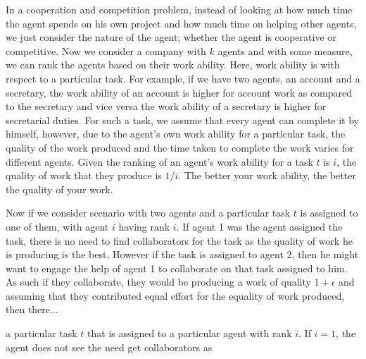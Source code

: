 \documentclass[a4paper,10pt]{article}
\theoremstyle{definition}
\begin{document}
In a cooperation and competition problem, instead of looking at how much time the agent spends on his own project and how much time on helping other agents, we just consider the nature of the agent; whether the agent is cooperative or competitive. Now we consider a company with $k$ agents and with some measure, we can rank the agents based on their work ability. Here, work ability is with respect to a particular task. For example, if we have two agents, an account and a secretary, the work ability of an account is higher for account work as compared to the secretary and vice versa the work ability of a secretary is higher for secretarial duties. For such a task, we assume that every agent can complete it by himself, however, due to the agent's own work ability for a particular task, the quality of the work produced and the time taken to complete the work varies for different agents. Given the ranking of an agent's work ability for a task $t$ is $i$, the quality of work that they produce is $1/i$. The better your work ability, the better the quality of your work.

Now if we consider scenario with two agents and a particular task $t$ is assigned to one of them, with agent $i$ having rank $i$. If agent 1 was the agent assigned the task, there is no need to find collaborators for the task as the quality of work he is producing is the best. However if the task is assigned to agent 2, then he might want to engage the help of agent 1 to collaborate on that task assigned to him. As such if they collaborate, they would be producing a work of quality $1+\epsilon$ and assuming that they contributed equal effort for the equality of work produced, then there...


a particular task $t$ that is assigned to a particular agent with rank $i$. If $i=1$, the agent does not see the need get collaborators as 
\end{document}
